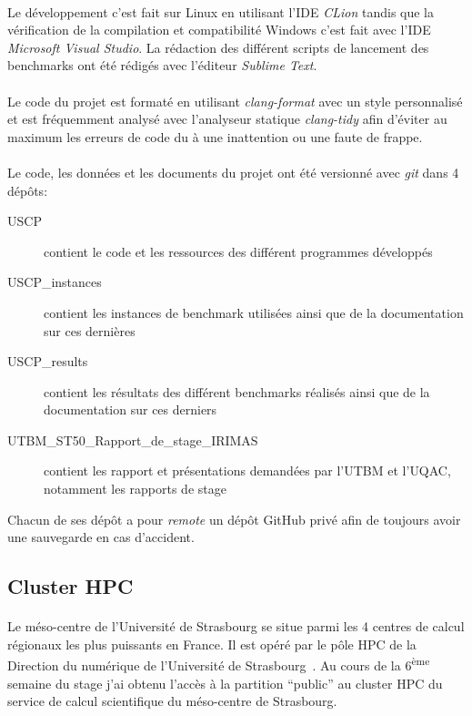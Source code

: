 \documentclass[a4paper,11pt,twoside,french,report]{../common/simplem}
\begin{document}
				\paragraph*{}
					Le développement c'est fait sur Linux en utilisant l'\gls{IDE} \textit{CLion} tandis que la vérification de la compilation et compatibilité Windows c'est fait avec l'\gls{IDE} \textit{Microsoft Visual Studio}. La rédaction des différent scripts de lancement des benchmarks ont été rédigés avec l'éditeur \textit{Sublime Text}.
				\paragraph*{}
					Le code du projet est formaté en utilisant \textit{clang-format} avec un style personnalisé et est fréquemment analysé avec l'analyseur statique \textit{clang-tidy} afin d'éviter au maximum les erreurs de code du à une inattention ou une faute de frappe.
				\paragraph*{}
					Le code, les données et les documents du projet ont été versionné avec \textit{git} dans 4 dépôts:
					\begin{description}
						\item[USCP] contient le code et les ressources des différent programmes développés
						\item[USCP\_instances] contient les instances de benchmark utilisées ainsi que de la documentation sur ces dernières
						\item[USCP\_results] contient les résultats des différent benchmarks réalisés ainsi que de la documentation sur ces derniers
						\item[UTBM\_ST50\_Rapport\_de\_stage\_IRIMAS] contient les rapport et présentations demandées par l'\gls{UTBM} et l'\gls{UQAC}, notamment les rapports de stage
					\end{description}
					Chacun de ses dépôt a pour \textit{remote} un dépôt GitHub privé afin de toujours avoir une sauvegarde en cas d'accident.
			\subsection{Cluster \acrshort{HPC}}
				\paragraph*{}
					Le méso-centre de l'Université de Strasbourg se situe parmi les 4 centres de calcul régionaux les plus puissants en France. Il est opéré par le pôle \gls{HPC} de la Direction du numérique de l'Université de Strasbourg~\cite{UNISTRA_Calcul_scientifique}. Au cours de la 6\textsuperscript{ème} semaine du stage j'ai obtenu l'accès à la partition ``public'' au cluster \gls{HPC} du service de calcul scientifique du méso-centre de Strasbourg.
\end{document}
